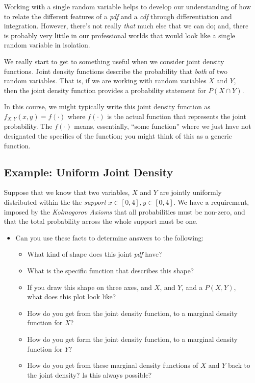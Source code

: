 \documentclass[
]{book}
\providecommand{\tightlist}{%
  \setlength{\itemsep}{0pt}\setlength{\parskip}{0pt}}
\theoremstyle{definition}
\theoremstyle{definition}
\theoremstyle{definition}
\theoremstyle{definition}
\theoremstyle{remark}
\begin{document}
Working with a single random variable helps to develop our understanding of how to relate the different features of a \emph{pdf} and a \emph{cdf} through differentiation and integration. However, there's not really \emph{that} much else that we can do; and, there is probably very little in our professional worlds that would look like a single random variable in isolation.

We really start to get to something useful when we consider joint density functions. Joint density functions describe the probability that \emph{both} of two random variables. That is, if we are working with random variables \(X\) and \(Y\), then the joint density function provides a probability statement for \(P(X \cap Y)\).

In this course, we might typically write this joint density function as \(f_{X,Y}(x,y) = f(\cdot)\) where \(f(\cdot)\) is the actual function that represents the joint probability. The \(f(\cdot)\) means, essentially, ``some function'' where we just have not designated the specifics of the function; you might think of this as a generic function.

\subsection{Example: Uniform Joint Density}\label{example-uniform-joint-density}

Suppose that we know that two variables, \(X\) and \(Y\) are jointly uniformly distributed within the the \emph{support} \(x \in [0,4], y \in [0,4]\). We have a requirement, imposed by the \emph{Kolmogorov Axioms} that all probabilities must be non-zero, and that the total probability across the whole support must be one.

\begin{itemize}
\tightlist
\item
  Can you use these facts to determine answers to the following:

  \begin{itemize}
  \tightlist
  \item
    What kind of shape does this joint \emph{pdf} have?
  \item
    What is the specific function that describes this shape?
  \item
    If you draw this shape on three axes, and \(X\), and \(Y\), and a \(P(X,Y)\), what does this plot look like?
  \item
    How do you get from the joint density function, to a marginal density function for \(X\)?
  \item
    How do you get form the joint density function, to a marginal density function for \(Y\)?
  \item
    How do you get from these marginal density functions of \(X\) and \(Y\) back to the joint density? Is this always possible?
  \end{itemize}
\end{itemize}
\end{document}
